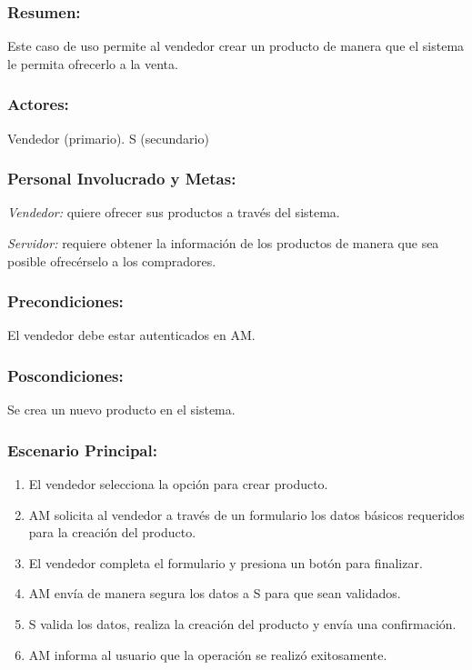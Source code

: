 \begin{framed}


\subsubsection{Resumen:} Este caso de uso permite al vendedor crear un producto de manera que el sistema le permita ofrecerlo a la venta.


\subsubsection{Actores:} Vendedor (primario). S (secundario)

\subsubsection{Personal Involucrado y Metas:}

\emph{Vendedor:} quiere ofrecer sus productos a través del sistema.

\emph{Servidor:} requiere obtener la información de los  productos de manera que sea posible ofrecérselo a los compradores.

\subsubsection{Precondiciones:} 
El vendedor debe estar autenticados en AM. 

\subsubsection{Poscondiciones:} 
Se crea un nuevo producto en el sistema.

\subsubsection{Escenario Principal: }

\begin{enumerate}
    \item El vendedor selecciona la opción para crear producto. 
    \item AM solicita al vendedor a través de un formulario los datos básicos requeridos para la creación del producto.
    \item El vendedor completa el formulario y presiona un botón para finalizar.
    \item AM envía de manera segura los datos a S para que sean validados.
    \item S valida los datos, realiza la creación del producto y envía una confirmación.
    \item AM informa al usuario que la operación se realizó exitosamente.
\end{enumerate}


\end{framed}
